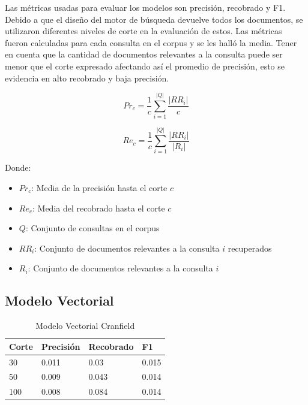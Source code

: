 \documentclass[runningheads]{llncs}
\begin{document}
Las métricas usadas para evaluar los modelos son precisión, recobrado y F1. Debido a que el diseño del
motor de búsqueda devuelve todos los documentos, se utilizaron diferentes niveles de corte en la evaluación
de estos. Las métricas fueron calculadas para cada consulta en el corpus y se les halló la media. Tener en cuenta
que la cantidad de documentos relevantes a la consulta puede ser menor que el corte expresado afectando así el
promedio de precisión, esto se evidencia en alto recobrado y baja precisión.

\begin{equation}
Pr_c = \frac{1}{c} \sum_{i=1}^{|Q|} \frac{|RR_i|}{c}
\end{equation}

\begin{equation}
Re_c = \frac{1}{c} \sum_{i=1}^{|Q|} \frac{|RR_i|}{|R_i|}
\end{equation}

Donde:

\begin{itemize}

	\item $Pr_c$: Media de la precisión hasta el corte $c$
	\item $Re_c$: Media del recobrado hasta el corte $c$
	\item $Q$: Conjunto de consultas en el corpus
	\item $RR_i$: Conjunto de documentos relevantes a la consulta $i$ recuperados
	\item $R_i$: Conjunto de documentos relevantes a la consulta $i$

\end{itemize}

\newpage

\subsection{Modelo Vectorial}

\begin{table}
	\caption{Modelo Vectorial Cranfield}\label{cran_vec_result}
 \begin{tabular}{|l|l|l|l|}
 \hline
 	Corte &  Precisión & Recobrado & F1\\
 \hline
	30 & 0.011 & 0.03 & 0.015\\
	50 & 0.009 & 0.043 & 0.014\\
	100 & 0.008 & 0.084 & 0.014\\
 \hline
 \end{tabular}
\end{table}
\end{document}
